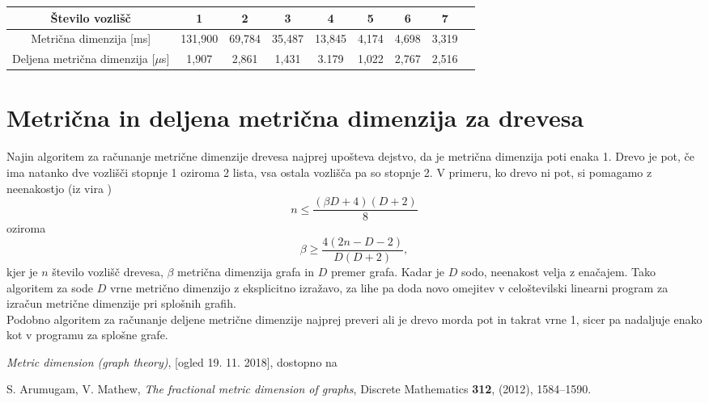 \documentclass[a4paper]{report}
\begin{document}
\begin{center}
\resizebox{13cm}{!} {
\begin{tabular}{||c| |*{8}{c|}|}
\hline\hline
Število vozlišč & 1 & 2 & 3 & 4 & 5 & 6 & 7 \\
\hline
Metrična dimenzija [ms] & 131,900 & 69,784 & 35,487 & 13,845 & 4,174 & 4,698 & 3,319 \\
\hline
Deljena metrična dimenzija [$\mu$s] & 1,907 & 2,861 & 1,431 & 3.179 & 1,022 & 2,767 & 2,516 \\
\hline\hline
\end{tabular}}
\end{center}

\section*{Metrična in deljena metrična dimenzija za drevesa}

Najin algoritem za računanje metrične dimenzije drevesa najprej upošteva dejstvo, da je metrična dimenzija poti enaka 1. Drevo je pot, če ima natanko dve vozlišči stopnje 1 oziroma 2 lista, vsa ostala vozlišča pa so stopnje 2. V primeru, ko drevo ni pot, si pomagamo z neenakostjo (iz vira \cite{1}) $$n \le \frac{( \beta D + 4)(D + 2)}{8}$$ oziroma $$\beta \ge \frac{4(2n - D - 2)}{D(D + 2)},$$ kjer je $n$ število vozlišč drevesa, $\beta$ metrična dimenzija grafa in $D$ premer grafa. Kadar je $D$ sodo, neenakost velja z enačajem. Tako algoritem za sode $D$ vrne metrično dimenzijo z eksplicitno izražavo, za lihe pa doda novo omejitev v celoštevilski linearni program za izračun metrične dimenzije pri splošnih grafih.\\

Podobno algoritem za računanje deljene metrične dimenzije najprej preveri ali je drevo morda pot in takrat vrne 1, sicer pa nadaljuje enako kot v programu za splošne grafe. \\ 



\begin{thebibliography}{99}

 \textit{Metric dimension (graph theory)}, [ogled 19. 11. 2018], dostopno na %

 S. Arumugam, V. Mathew, \textit{The fractional metric dimension of graphs}, Discrete Mathematics \textbf{312},  (2012), 1584–1590.

\end{thebibliography}
\end{document}
